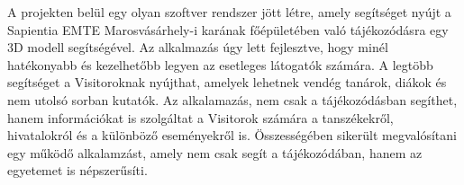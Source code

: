 A projekten belül egy olyan szoftver rendszer jött létre, amely segítséget nyújt a Sapientia EMTE Marosvásárhely-i karának főépületében való tájékozódásra egy 3D modell segítségével. Az alkalmazás úgy lett fejlesztve, hogy minél hatékonyabb és kezelhetőbb legyen az esetleges látogatók számára. A legtöbb segítséget a Visitoroknak nyújthat, amelyek lehetnek vendég tanárok, diákok és nem utolsó sorban kutatók. Az alkalamazás, nem csak a tájékozódásban segíthet, hanem információkat is szolgáltat a Visitorok számára a tanszékekről, hivatalokról és a különböző eseményekről is. Összességében sikerült megvalósítani egy működő alkalamzást, amely nem csak segít a tájékozódában, hanem az egyetemet is népszerűsíti.